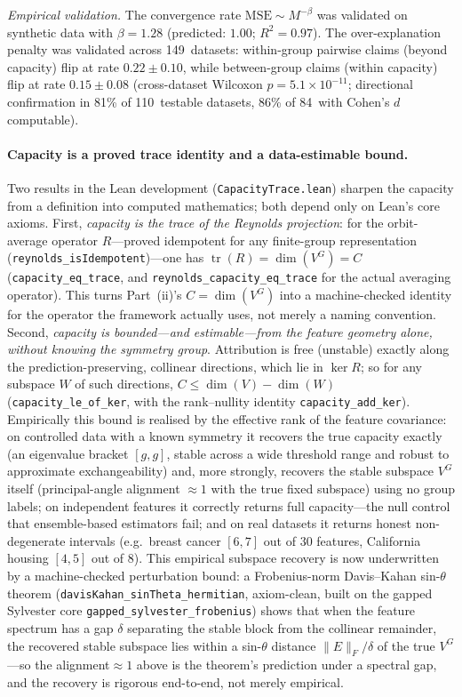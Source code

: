 \documentclass[11pt,a4paper]{article}
\begin{document}
\emph{Empirical validation.}  The convergence rate $\text{MSE} \sim M^{-\beta}$ was validated on synthetic data with $\beta = 1.28$ (predicted: $1.00$; $R^2 = 0.97$).  The over-explanation penalty was validated across 149~datasets: within-group pairwise claims (beyond capacity) flip at rate $0.22 \pm 0.10$, while between-group claims (within capacity) flip at rate $0.15 \pm 0.08$ (cross-dataset Wilcoxon $p = 5.1 \times 10^{-11}$; directional confirmation in 81\% of 110~testable datasets, 86\% of 84~with Cohen's $d$ computable).

\paragraph{Capacity is a proved trace identity and a data-estimable bound.}
Two results in the Lean development (\texttt{CapacityTrace.lean}) sharpen the capacity from a
definition into computed mathematics; both depend only on Lean's core axioms.  First,
\emph{capacity is the trace of the Reynolds projection}: for the orbit-average operator $R$---proved
idempotent for any finite-group representation (\texttt{reynolds\_isIdempotent})---one has
$\operatorname{tr}(R) = \dim(V^G) = C$ (\texttt{capacity\_eq\_trace}, and
\texttt{reynolds\_capacity\_eq\_trace} for the actual averaging operator).  This turns Part~(ii)'s
$C = \dim(V^G)$ into a machine-checked identity for the operator the framework actually uses, not
merely a naming convention.  Second, \emph{capacity is bounded---and estimable---from the feature
geometry alone, without knowing the symmetry group}.  Attribution is free (unstable) exactly along
the prediction-preserving, collinear directions, which lie in $\ker R$; so for any subspace $W$ of
such directions, $C \leq \dim(V) - \dim(W)$ (\texttt{capacity\_le\_of\_ker}, with the rank--nullity
identity \texttt{capacity\_add\_ker}).  Empirically this bound is realised by the effective rank of
the feature covariance: on controlled data with a known symmetry it recovers the true capacity
exactly (an eigenvalue bracket $[g,g]$, stable across a wide threshold range and robust to
approximate exchangeability) and, more strongly, recovers the stable subspace $V^G$ itself
(principal-angle alignment $\approx 1$ with the true fixed subspace) using no group labels; on
independent features it correctly returns full capacity---the null control that ensemble-based
estimators fail; and on real datasets it returns honest non-degenerate intervals (e.g.\ breast
cancer $[6,7]$ out of $30$ features, California housing $[4,5]$ out of $8$).  This empirical subspace
recovery is now underwritten by a machine-checked perturbation bound: a Frobenius-norm Davis--Kahan
sin-$\theta$ theorem (\texttt{davisKahan\_sinTheta\_hermitian}, axiom-clean, built on the gapped
Sylvester core \texttt{gapped\_sylvester\_frobenius}) shows that when the feature spectrum has a gap
$\delta$ separating the stable block from the collinear remainder, the recovered stable subspace lies
within a sin-$\theta$ distance $\|E\|_F/\delta$ of the true $V^G$---so the alignment${}\approx 1$
above is the theorem's prediction under a spectral gap, and the recovery is rigorous end-to-end, not
merely empirical.
\end{document}
